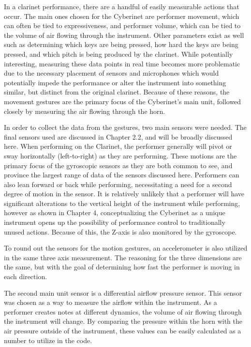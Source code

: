In a clarinet performance, there are a handful of easily measurable actions that occur. The main ones chosen for the Cyberinet are performer movement, which can often be tied to expressiveness\cite{wanderleyClarinetGesture2005}, and performer volume, which can be tied to the volume of air flowing through the instrument. Other parameters exist as well such as determining which keys are being pressed, how hard the keys are being pressed, and which pitch is being produced by the clarinet. While potentially interesting, measuring these data points in real time becomes more problematic due to the necessary placement of sensors and microphones which would potentially impede the performance or alter the instrument into something similar, but distinct from the original clarinet. Because of these reasons, the movement gestures are the primary focus of the Cyberinet's main unit, followed closely by measuring the air flowing through the horn.

In order to collect the data from the gestures, two main sensors were needed. The final sensors used are discussed in Chapter 2.2, and will be broadly discussed here. When performing on the Clarinet, the performer generally will pivot or sway horizontally (left-to-right) as they are performing. These motions are the primary focus of the gyroscopic sensors as they are both common to see, and province the largest range of data of the sensors discussed here. Performers can also lean forward or back while performing, necessitating a need for a second degree of motion in the sensor. It is relatively unlikely that a performer will have significant alterations to the vertical height of the instrument while performing, however as shown in Chapter 4, conceptualizing the Cyberinet as a unique instrument opens up the possibility of performance control to traditionally unused actions. Because of this, the Z-axis is also monitored by the gyroscope.

To round out the sensors for the motion gestures, an accelerometer is also utilized in the same three axis measurement. The reasoning for the three dimensions are the same, but with the goal of determining how fast the performer is moving in each direction.

The second main unit sensor is a differential airflow pressure sensor. This sensor was chosen as a way to measure the airflow within the instrument. As a performer creates notes at different dynamics, the volume of air flowing through the instrument will change. By comparing the pressure within the horn with the air pressure outside of the instrument, these values can be easily calculated as a number to utilize in the code.

